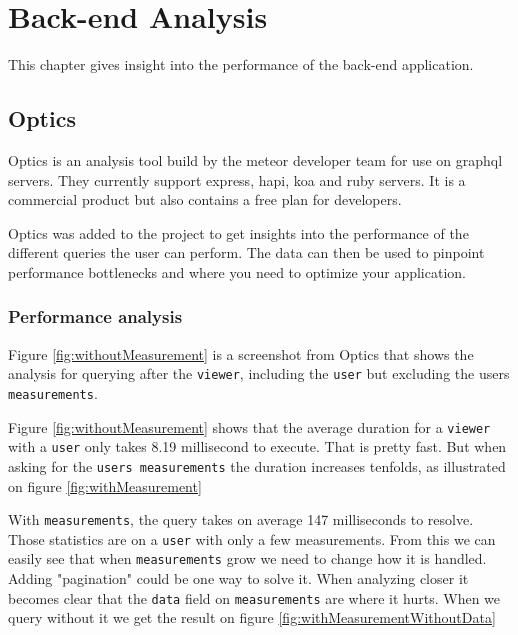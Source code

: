 \chapter{Back-end Analysis}
This chapter gives insight into the performance of the back-end application.

\section{Optics}
Optics is an analysis tool build by the \gls{meteor} developer team for use on
\gls{graphql} servers. They currently support \gls{express}, \gls{hapi}, \gls{koa} and \gls{ruby} servers. It is a
commercial product but also contains a free plan for developers.

Optics was added to the project to get insights into the performance of the
different queries the user can perform. The data can then be used to pinpoint
performance bottlenecks and where you need to optimize your application.

\subsection{Performance analysis}
Figure \ref{fig:withoutMeasurement} is a screenshot from Optics that shows the analysis for querying after
the \verb+viewer+, including the \verb+user+ but excluding the users \verb+measurements+.


\newpage

Figure \ref{fig:withoutMeasurement} shows that the average duration for a \verb+viewer+ with
a \verb+user+ only takes 8.19 millisecond to execute. That is pretty fast. But when
asking for the \verb+users measurements+ the duration increases tenfolds, as
illustrated on figure \ref{fig:withMeasurement}


\newpage

With \verb+measurements+, the query takes on average 147 milliseconds to resolve.
Those statistics are on a \verb+user+ with only a few measurements. From this we can easily see that
when \verb+measurements+ grow we need to change how it is handled. Adding "pagination"
could be one way to solve it. When analyzing closer it becomes clear that the
\verb+data+ field on \verb+measurements+ are where it hurts. When we query without it we get
the result on figure \ref{fig:withMeasurementWithoutData}

